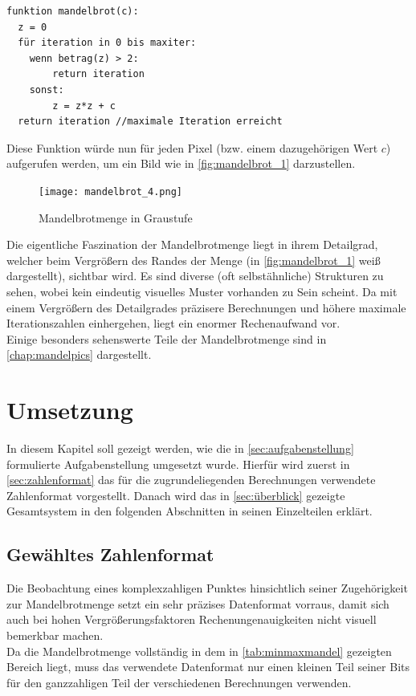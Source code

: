 \documentclass[a4paper,12pt,onesided]{report}
\begin{document}
\begin{lstlisting}[label=lst:mandelbrotpseudo,caption=Algorithmus zur Berechnung der Iterationszahl eines $c$]
funktion mandelbrot(c):
  z = 0
  für iteration in 0 bis maxiter:
 	wenn betrag(z) > 2:
 		return iteration
 	sonst:	
		z = z*z + c
  return iteration //maximale Iteration erreicht
\end{lstlisting}

Diese Funktion würde nun für jeden Pixel (bzw. einem dazugehörigen Wert $c$) aufgerufen werden, um ein Bild wie in \autoref{fig:mandelbrot_1} darzustellen.

\begin{figure}[H]
	\centering
	\texttt{[image: mandelbrot\_4.png]}
	\caption{Mandelbrotmenge in Graustufe}
	\label{fig:mandelbrot_1}
\end{figure}

Die eigentliche Faszination der Mandelbrotmenge liegt in ihrem Detailgrad, welcher beim Vergrößern des Randes der Menge (in \autoref{fig:mandelbrot_1} weiß dargestellt), sichtbar wird. Es sind diverse (oft selbstähnliche) Strukturen zu sehen, wobei kein eindeutig visuelles Muster vorhanden zu Sein scheint. Da mit einem Vergrößern des Detailgrades präzisere Berechnungen und höhere maximale Iterationszahlen einhergehen, liegt ein enormer Rechenaufwand vor.\\
Einige besonders sehenswerte Teile der Mandelbrotmenge sind in \autoref{chap:mandelpics}
dargestellt.

\chapter{Umsetzung}
In diesem Kapitel soll gezeigt werden, wie die in \autoref{sec:aufgabenstellung} formulierte Aufgabenstellung umgesetzt wurde. Hierfür wird zuerst in \autoref{sec:zahlenformat} das für die zugrundeliegenden Berechnungen verwendete Zahlenformat vorgestellt. Danach wird das in \autoref{sec:überblick} gezeigte Gesamtsystem in den folgenden Abschnitten in seinen Einzelteilen erklärt.

\section{Gewähltes Zahlenformat}
\label{sec:zahlenformat}
Die Beobachtung eines komplexzahligen Punktes hinsichtlich seiner Zugehörigkeit zur Mandelbrotmenge setzt ein sehr präzises Datenformat vorraus, damit sich auch bei hohen Vergrößerungsfaktoren Rechenungenauigkeiten nicht visuell bemerkbar machen.\\
Da die Mandelbrotmenge vollständig in dem in \autoref{tab:minmaxmandel} gezeigten Bereich liegt, muss das verwendete Datenformat nur einen kleinen Teil seiner Bits für den ganzzahligen Teil der verschiedenen Berechnungen verwenden. \\
\end{document}
